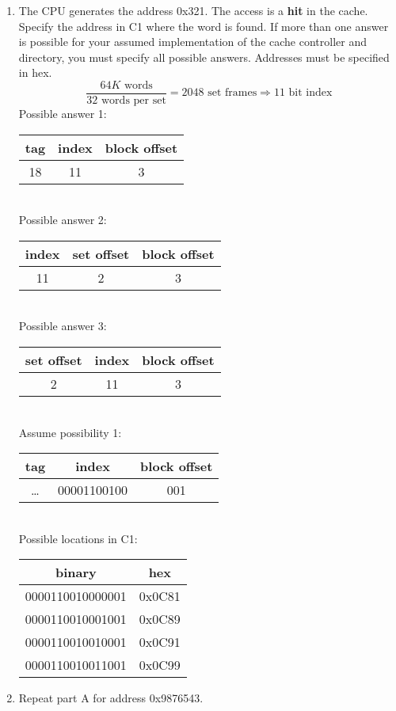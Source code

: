 \documentclass[10pt,letterpaper]{article}
\begin{document}
\begin{enumerate}[label=\textbf{Problem \arabic*.}]
	\begin{enumerate}[label=\Alph*)]
	\item The CPU generates the address 0x321. The access is a \textbf{hit} in the cache. Specify the address in C1 where the word is found. If more than one answer is possible for your assumed implementation of the cache controller and directory, you must specify all possible answers. Addresses must be specified in hex.
	\[\frac{64 K \text{ words}}{32 \text{ words per set}} = 2048 \text{ set frames} \Rightarrow 11 \text{ bit index}\]
	Possible answer 1: \begin{tabular}{|c|c|c|}
	\hline
	\textbf{tag} & \textbf{index} & \textbf{block offset}\\
	\hline
	18 & 11 & 3 \\
	\hline
	\end{tabular}\\
	Possible answer 2: \begin{tabular}{|c|c|c|}
	\hline
	\textbf{index} & \textbf{set offset} & \textbf{block offset}\\
	\hline
	11 & 2 & 3 \\
	\hline
	\end{tabular}\\
	Possible answer 3: \begin{tabular}{|c|c|c|}
	\hline
	\textbf{set offset} & \textbf{index} & \textbf{block offset}\\
	\hline
	2 & 11 & 3 \\
	\hline
	\end{tabular}\\
	Assume possibility 1:\begin{tabular}{|c|c|c|}
	\hline
	\textbf{tag} & \textbf{index} & \textbf{block offset}\\
	\hline
	\dots & 00001100100 & 001 \\
	\hline
	\end{tabular}\\
	Possible locations in C1:
	\begin{tabular}{|c|c|}
	\hline
	\textbf{binary} & \textbf{hex} \\
	\hline
	0000110010000001 & 0x0C81\\
	\hline
	0000110010001001 & 0x0C89\\
	\hline
	0000110010010001 & 0x0C91\\
	\hline
	0000110010011001 & 0x0C99\\
	\hline
	\end{tabular}
	\item Repeat part A for address 0x9876543.

\end{enumerate}
\end{enumerate}
\end{document}
